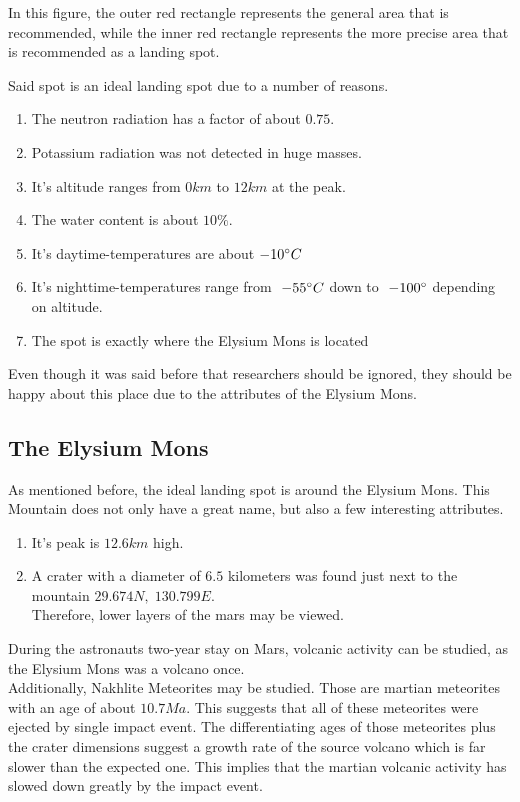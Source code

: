 \documentclass{article}
\begin{document}
In this figure, the outer red rectangle represents the general area that is recommended, while the inner red rectangle represents the more precise area that is recommended as a landing spot.

Said spot is an ideal landing spot due to a number of reasons.
\begin{enumerate}
    \item The neutron radiation has a factor of about \(0.75\). \\
    \item Potassium radiation was not detected in huge masses.
    \item It's altitude ranges from \(0km\) to \(12km\) at the peak.
    \item The water content is about \(10\%\).
    \item It's daytime-temperatures are about \(-10 \degree C\)
    \item It's nighttime-temperatures range from \(~-55 \degree C\) down to \(~-100 \degree\) depending on altitude. 
    \item The spot is exactly where the Elysium Mons is located
\end{enumerate}

Even though it was said before that researchers should be ignored, they should be happy about this place due to the attributes of the Elysium Mons.

\subsection{The Elysium Mons}
As mentioned before, the ideal landing spot is around the Elysium Mons.
This Mountain does not only have a great name, but also a few interesting attributes.
\begin{enumerate}
    \item It's peak is \(12.6km\) high.
    \item A crater with a diameter of \(6.5\) kilometers was found just next to the mountain \(29.674N, \; 130.799E\). \\ Therefore, lower layers of the mars may be viewed.
\end{enumerate}

During the astronauts two-year stay on Mars, volcanic activity can be studied, as the Elysium Mons was a volcano once.
\\
Additionally, Nakhlite Meteorites may be studied. 
Those are martian meteorites with an age of about \(10.7 Ma\).
This suggests that all of these meteorites were ejected by single impact event.
The differentiating ages of those meteorites plus the crater dimensions suggest a growth rate of the source volcano which is far slower than the expected one.
This implies that the martian volcanic activity has slowed down greatly by the impact event.
\end{document}
